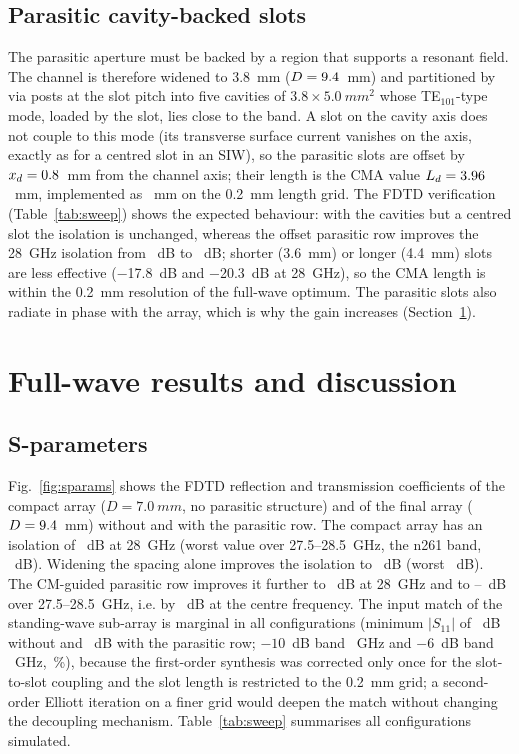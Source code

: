 \documentclass[preprint,12pt]{elsarticle}
\begin{document}
\subsection{Parasitic cavity-backed slots}
The parasitic aperture must be backed by a region that supports a resonant field. The channel is therefore widened to \SI{3.8}{mm} ($D = 9.4$~mm) and partitioned by via posts at the slot pitch into five cavities of $3.8\times\SI{5.0}{mm^2}$ whose TE$_{101}$-type mode, loaded by the slot, lies close to the band. A slot on the cavity axis does not couple to this mode (its transverse surface current vanishes on the axis, exactly as for a centred slot in an SIW), so the parasitic slots are offset by $x_d = 0.8$~mm from the channel axis; their length is the CMA value $L_d = 3.96$~mm, implemented as \Lduse~mm on the \SI{0.2}{mm} length grid. The FDTD verification (Table~\ref{tab:sweep}) shows the expected behaviour: with the cavities but a centred slot the isolation is unchanged, whereas the offset parasitic row improves the 28~GHz isolation from \IsoRefTwentyEight~dB to \IsoDecTwentyEight~dB; shorter (3.6~mm) or longer (4.4~mm) slots are less effective (\SI{-17.8}{dB} and \SI{-20.3}{dB} at 28~GHz), so the CMA length is within the \SI{0.2}{mm} resolution of the full-wave optimum. The parasitic slots also radiate in phase with the array, which is why the gain increases (Section~\ref{sec:results}).

\section{Full-wave results and discussion}\label{sec:results}
\subsection{S-parameters}
Fig.~\ref{fig:sparams} shows the FDTD reflection and transmission coefficients of the compact array ($D = \SI{7.0}{mm}$, no parasitic structure) and of the final array ($D = 9.4$~mm) without and with the parasitic row. The compact array has an isolation of \IsoSeventy~dB at 28~GHz (worst value over 27.5--28.5~GHz, the n261 band, \IsoSeventyMin~dB). Widening the spacing alone improves the isolation to \IsoRefTwentyEight~dB (worst \IsoRefMin~dB). The CM-guided parasitic row improves it further to \IsoDecTwentyEight~dB at 28~GHz and to \IsoDecMin--\IsoDecMax~dB over 27.5--28.5~GHz, i.e. by \IsoGain~dB at the centre frequency. The input match of the standing-wave sub-array is marginal in all configurations (minimum $|S_{11}|$ of \SElevenRef~dB without and \SElevenDec~dB with the parasitic row; $-10$~dB band \BWdec~GHz and $-6$~dB band \BWsixDec~GHz, \BWsixDecRel\,\%), because the first-order synthesis was corrected only once for the slot-to-slot coupling and the slot length is restricted to the \SI{0.2}{mm} grid; a second-order Elliott iteration on a finer grid would deepen the match without changing the decoupling mechanism. Table~\ref{tab:sweep} summarises all configurations simulated.
\end{document}

